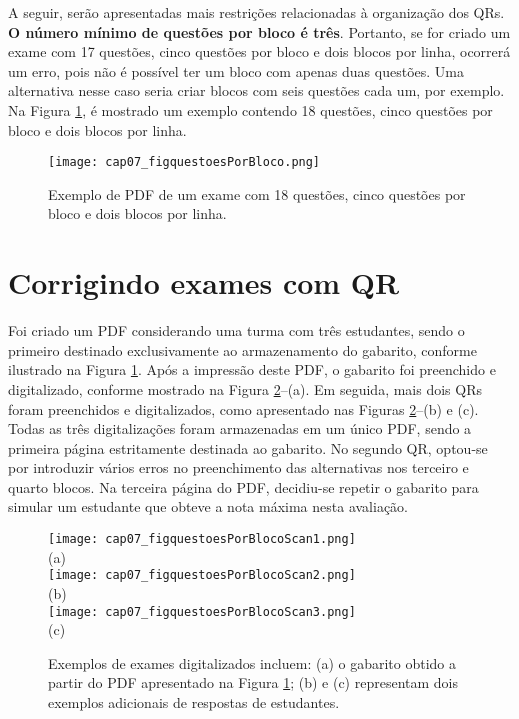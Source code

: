 A seguir, serão apresentadas mais restrições relacionadas à organização dos QRs. \textbf{O número mínimo de questões por bloco é três}. Portanto, se for criado um exame com 17 questões, cinco questões por bloco e dois blocos por linha, ocorrerá um erro, pois não é possível ter um bloco com apenas duas questões. Uma alternativa nesse caso seria criar blocos com seis questões cada um, por exemplo. Na Figura \ref{fig:cap07_figquestoesPorBloco}, é mostrado um exemplo contendo 18 questões, cinco questões por bloco e dois blocos por linha.



\begin{figure}[htbp]
\centering
\texttt{[image: cap07\_figquestoesPorBloco.png]}
\caption{Exemplo de PDF de um exame com 18 questões, cinco questões por bloco e dois blocos por linha.}
\label{fig:cap07_figquestoesPorBloco}
\end{figure}

\section{Corrigindo exames com QR}\label{sec:examesCorrigirQR}

Foi criado um PDF considerando uma turma com três estudantes, sendo o primeiro destinado exclusivamente ao armazenamento do gabarito, conforme ilustrado na Figura \ref{fig:cap07_figquestoesPorBloco}. Após a impressão deste PDF, o gabarito foi preenchido e digitalizado, conforme mostrado na Figura \ref{fig:cap07_figquestoesPorBlocoScan}--(a). Em seguida, mais dois QRs foram preenchidos e digitalizados, como apresentado nas Figuras \ref{fig:cap07_figquestoesPorBlocoScan}--(b) e (c). Todas as três digitalizações foram armazenadas em um único PDF, sendo a primeira página estritamente destinada ao gabarito. No segundo QR, optou-se por introduzir vários erros no preenchimento das alternativas nos terceiro e quarto blocos. Na terceira página do PDF, decidiu-se repetir o gabarito para simular um estudante que obteve a nota máxima nesta avaliação.

\begin{figure}[htbp]
\centering
\texttt{[image: cap07\_figquestoesPorBlocoScan1.png]}\\(a)\\
\texttt{[image: cap07\_figquestoesPorBlocoScan2.png]}\\(b)\\
\texttt{[image: cap07\_figquestoesPorBlocoScan3.png]}\\(c)
\caption{Exemplos de exames digitalizados incluem: (a) o gabarito obtido a partir do PDF apresentado na Figura \ref{fig:cap07_figquestoesPorBloco}; (b) e (c) representam dois exemplos adicionais de respostas de estudantes.}
\label{fig:cap07_figquestoesPorBlocoScan}
\end{figure}

